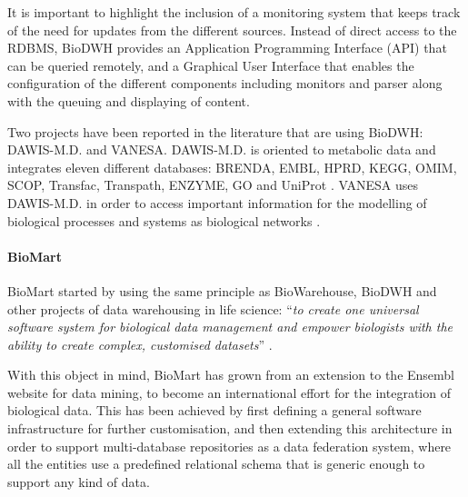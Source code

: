 It is important to highlight the inclusion of a monitoring system that keeps track of the need for updates from the different sources. Instead of direct access to the RDBMS, BioDWH provides an Application Programming Interface (API) that can be queried remotely, and a Graphical User Interface that enables the configuration of the different components including monitors and parser along with the queuing and displaying of content.

Two projects have been reported in the literature that are using BioDWH: DAWIS-M.D. and VANESA. DAWIS-M.D. is oriented to metabolic data and integrates eleven different databases: BRENDA, EMBL, HPRD, KEGG, OMIM, SCOP, Transfac, Transpath, ENZYME, GO and UniProt \cite{HIP2010}. VANESA uses DAWIS-M.D. in order to access important information for the modelling of biological processes and systems as biological networks \cite{BRI2014}.

\paragraph{BioMart}
BioMart started by using the same principle as BioWarehouse, BioDWH and other projects of data warehousing in life science: ``\emph{to create one universal software system for biological data management and empower biologists with the ability to create complex, customised datasets}'' \cite{KAS2011}.

With this object in mind, BioMart has grown from an extension to the Ensembl website for data mining, to become an international effort for the integration of biological data. This has been achieved by first defining a general software infrastructure for further customisation, and then extending this architecture in order to support multi-database repositories as a data federation system, where all the entities use a predefined relational schema that is generic enough to support any kind of data.

